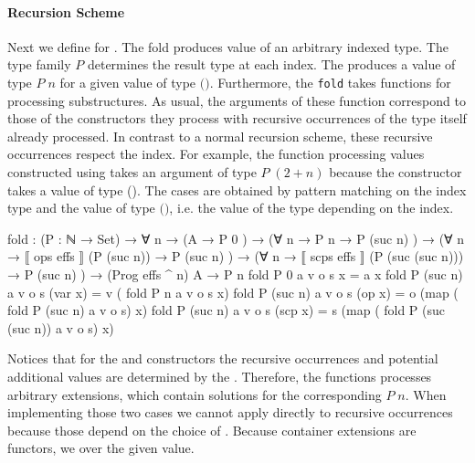 \paragraph{Recursion Scheme} Next we define  for
\AgdaSpace{}\AgdaSpace{}.
The fold produces value of an arbitrary  indexed type.
The type family $P$ determines the result type at each index.
The  produces a value of type $P\;n$ for a given value of
type
$($\AgdaSpace{}\AgdaSpace{}\AgdaFunction{\textasciicircum}\AgdaSpace{}$)$\AgdaSpace{}.
Furthermore, the \texttt{fold} takes functions for processing substructures.
As usual, the arguments of these function correspond to those of the
constructors they process with recursive occurrences of the type itself already
processed.
In contrast to a normal recursion scheme, these recursive occurrences respect
the index.
For example, the function processing values constructed using
 takes an argument of type $P\;(2 + n)$ because
the constructor takes a value of type 
\AgdaSpace{}\AgdaSpace{}(\AgdaSpace{}\AgdaSpace{}).
The cases are obtained by pattern matching on the index type and the value of
type
$($\AgdaSpace{}\AgdaSpace{}\AgdaFunction{\textasciicircum}\AgdaSpace{}$)$\AgdaSpace{},
i.e. the value of the type depending on the index.

\begin{code}
fold : (P : ℕ → Set) → ∀ n →
  (A                                           → P 0        )  →
  (∀ {n} → P n                                 → P (suc n)  )  →
  (∀ {n} → ⟦ ops   effs  ⟧  (P (suc n))        → P (suc n)  )  →
  (∀ {n} → ⟦ scps  effs  ⟧  (P (suc (suc n)))  → P (suc n)  )  →
  (Prog effs ^ n) A → P n
fold P 0        a v o s x         = a  x
fold P (suc n)  a v o s (var  x)  = v  (       fold P n              a v o s   x)
fold P (suc n)  a v o s (op   x)  = o  (map (  fold P (suc n)        a v o s)  x)
fold P (suc n)  a v o s (scp  x)  = s  (map (  fold P (suc (suc n))  a v o s)  x)
\end{code}
Notices that for the  and
 constructors the recursive occurrences and
potential additional values are determined by the .
Therefore, the functions processes arbitrary  extensions,
which contain solutions for the corresponding $P\;n$.
When implementing those two cases we cannot apply  directly
to recursive occurrences because those depend on the choice of
.
Because container extensions are functors, we  over the given
value.

